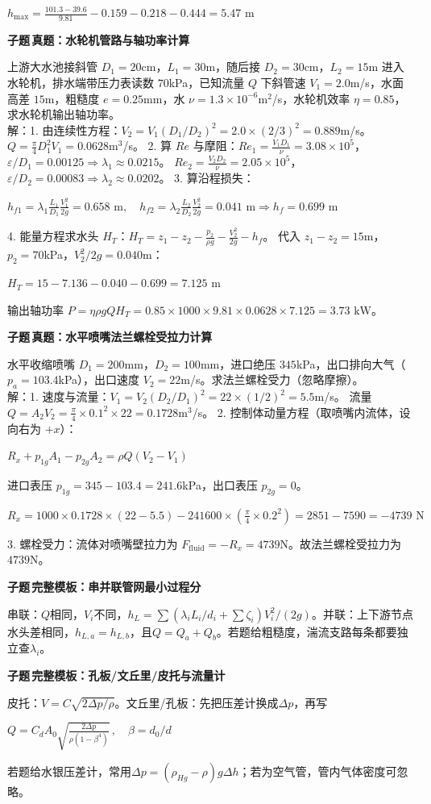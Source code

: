 \documentclass[a4paper]{article}
\newcommand{\tagsecbg}[3]{\vspace{0.10pt}\colorbox{subbg}{\begin{minipage}{\dimexpr\linewidth-2\fboxsep\relax}\fontsize{5.05}{5.24}\selectfont\bfseries\color{#1}\colorbox{#1}{\color{white}\fontsize{4.00}{4.14}\selectfont #2}\,\color{black}#3\end{minipage}}\par}
\newcommand{\subq}[1]{\tagsecbg{subc}{子题}{#1}}
\newcommand{\fmlb}[1]{\par\noindent\colorbox{bg}{\begin{minipage}{\dimexpr\linewidth-2\fboxsep\relax}\centering\fontsize{5.12}{5.42}\selectfont\ensuremath{\displaystyle #1}\end{minipage}}\par\vspace{0.10pt}}
\begin{document}
\begin{multicols*}{3}
\fmlb{h_{\max} = \frac{101.3 - 39.6}{9.81} - 0.159 - 0.218 - 0.444 = 5.47\text{ m}}
\subq{真题：水轮机管路与轴功率计算}
上游大水池接斜管 $D_1=20$cm，$L_1=30$m，随后接 $D_2=30$cm，$L_2=15$m 进入水轮机，排水端带压力表读数 $70$kPa，已知流量 $Q$ 下斜管速 $V_1=2.0$m/s，水面高差 $15$m，粗糙度 $e=0.25$mm，水 $\nu=1.3\times10^{-6}$m$^2$/s，水轮机效率 $\eta=0.85$，求水轮机输出轴功率。\\
解：1. 由连续性方程：$V_2 = V_1 (D_1/D_2)^2 = 2.0\times (2/3)^2 = 0.889$m/s。
$Q = \frac{\pi}{4} D_1^2 V_1 = 0.0628$m$^3$/s。
2. 算 $Re$ 与摩阻：$Re_1 = \frac{V_1 D_1}{\nu} = 3.08\times 10^5$，$\varepsilon/D_1 = 0.00125 \Rightarrow \lambda_1 \approx 0.0215$。
$Re_2 = \frac{V_2 D_2}{\nu} = 2.05\times 10^5$，$\varepsilon/D_2 = 0.00083 \Rightarrow \lambda_2 \approx 0.0202$。
3. 算沿程损失：
\fmlb{h_{f1} = \lambda_1 \frac{L_1}{D_1} \frac{V_1^2}{2g} = 0.658\text{ m},\quad
h_{f2} = \lambda_2 \frac{L_2}{D_2} \frac{V_2^2}{2g} = 0.041\text{ m} \Rightarrow h_f = 0.699\text{ m}}
4. 能量方程求水头 $H_T$：$H_T = z_1 - z_2 - \frac{p_2}{\rho g} - \frac{V_2^2}{2g} - h_f$。
代入 $z_1-z_2 = 15$m，$p_2=70$kPa，$V_2^2/2g = 0.040$m：
\fmlb{H_T = 15 - 7.136 - 0.040 - 0.699 = 7.125\text{ m}}
输出轴功率 $P = \eta \rho g Q H_T = 0.85 \times 1000 \times 9.81 \times 0.0628 \times 7.125 = 3.73\text{ kW}$。
\subq{真题：水平喷嘴法兰螺栓受拉力计算}
水平收缩喷嘴 $D_1=200$mm，$D_2=100$mm，进口绝压 $345$kPa，出口排向大气（$p_a=103.4$kPa），出口速度 $V_2=22$m/s。求法兰螺栓受力（忽略摩擦）。\\
解：1. 速度与流量：$V_1 = V_2 (D_2/D_1)^2 = 22 \times (1/2)^2 = 5.5$m/s。
流量 $Q = A_2 V_2 = \frac{\pi}{4} \times 0.1^2 \times 22 = 0.1728$m$^3$/s。
2. 控制体动量方程（取喷嘴内流体，设向右为 $+x$）：
\fmlb{R_x + p_{1g} A_1 - p_{2g} A_2 = \rho Q (V_2 - V_1)}
进口表压 $p_{1g} = 345 - 103.4 = 241.6$kPa，出口表压 $p_{2g}=0$。
\fmlb{R_x = 1000 \times 0.1728 \times (22 - 5.5) - 241600 \times \left(\frac{\pi}{4} \times 0.2^2\right) = 2851 - 7590 = -4739\text{ N}}
3. 螺栓受力：流体对喷嘴壁拉力为 $F_{\text{fluid}} = -R_x = 4739$N。故法兰螺栓受拉力为 $4739$N。
\subq{完整模板：串并联管网最小过程分}
串联：$Q$相同，$V_i$不同，$h_L=\sum(\lambda_iL_i/d_i+\sum\zeta_i)V_i^2/(2g)$。并联：上下游节点水头差相同，$h_{L,a}=h_{L,b}$，且$Q=Q_a+Q_b$。若题给粗糙度，湍流支路每条都要独立查$\lambda_i$。
\subq{完整模板：孔板/文丘里/皮托与流量计}
皮托：$V=C\sqrt{2\Delta p/\rho}$。文丘里/孔板：先把压差计换成$\Delta p$，再写
\fmlb{Q=C_dA_0\sqrt{\frac{2\Delta p}{\rho(1-\beta^4)}}\,,\quad \beta=d_0/d}
若题给水银压差计，常用$\Delta p=(\rho_{Hg}-\rho)g\Delta h$；若为空气管，管内气体密度可忽略。

\end{multicols*}
\end{document}
